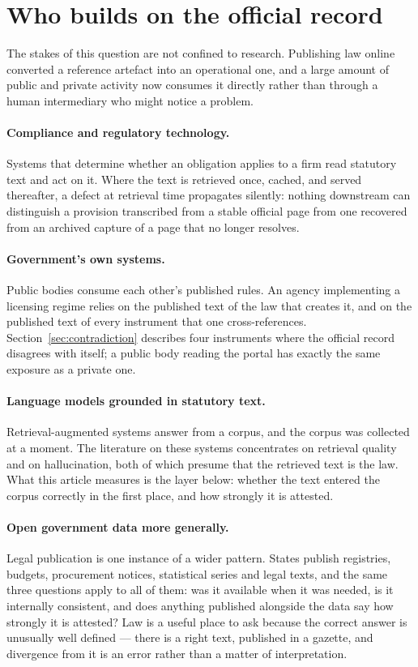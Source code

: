\documentclass[11pt]{article}
\begin{document}
\section{Who builds on the official record}

The stakes of this question are not confined to research. Publishing law online
converted a reference artefact into an operational one, and a large amount of
public and private activity now consumes it directly rather than through a
human intermediary who might notice a problem.

\paragraph{Compliance and regulatory technology.} Systems that determine
whether an obligation applies to a firm read statutory text and act on it.
Where the text is retrieved once, cached, and served thereafter, a defect at
retrieval time propagates silently: nothing downstream can distinguish a
provision transcribed from a stable official page from one recovered from an
archived capture of a page that no longer resolves.

\paragraph{Government's own systems.} Public bodies consume each other's
published rules. An agency implementing a licensing regime relies on the
published text of the law that creates it, and on the published text of every
instrument that one cross-references. Section~\ref{sec:contradiction} describes
four instruments where the official record disagrees with itself; a public body
reading the portal has exactly the same exposure as a private one.

\paragraph{Language models grounded in statutory text.} Retrieval-augmented
systems answer from a corpus, and the corpus was collected at a moment. The
literature on these systems concentrates on retrieval quality and on
hallucination, both of which presume that the retrieved text is the law. What
this article measures is the layer below: whether the text entered the corpus
correctly in the first place, and how strongly it is attested.

\paragraph{Open government data more generally.} Legal publication is one
instance of a wider pattern. States publish registries, budgets, procurement
notices, statistical series and legal texts, and the same three questions apply
to all of them: was it available when it was needed, is it internally
consistent, and does anything published alongside the data say how strongly it
is attested? Law is a useful place to ask because the correct answer is
unusually well defined --- there is a right text, published in a gazette, and
divergence from it is an error rather than a matter of interpretation.
\end{document}

